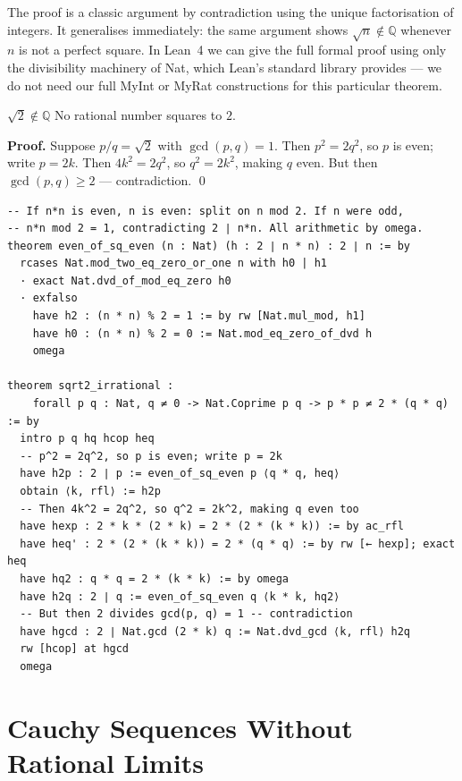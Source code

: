 \documentclass[12pt, openany]{book}
\theoremstyle{plain}
\theoremstyle{definition}
\theoremstyle{remark}
\newcommand{\Q}{\mathbb{Q}}
\newcommand{\li}[1]{{\ttfamily\small\color{tealaccent}#1}}
\begin{document}
The proof is a classic argument by contradiction using the unique factorisation of integers.  It generalises immediately: the same argument shows $\sqrt{n} \notin \Q$ whenever $n$ is not a perfect square.  In Lean~4 we can give the full formal proof using only the divisibility machinery of \li{Nat}, which Lean's standard library provides --- we do not need our full \li{MyInt} or \li{MyRat} constructions for this particular theorem.

\begin{thmbox}{$\sqrt{2} \notin \Q$}
No rational number squares to $2$.

\textbf{Proof.} Suppose $p/q = \sqrt{2}$ with $\gcd(p,q)=1$. Then $p^2 = 2q^2$, so $p$ is even; write $p = 2k$. Then $4k^2 = 2q^2$, so $q^2 = 2k^2$, making $q$ even. But then $\gcd(p,q) \geq 2$ --- contradiction. \qed
\end{thmbox}

\begin{leanbox}
\begin{lstlisting}
-- If n*n is even, n is even: split on n mod 2. If n were odd,
-- n*n mod 2 = 1, contradicting 2 ∣ n*n. All arithmetic by omega.
theorem even_of_sq_even (n : Nat) (h : 2 ∣ n * n) : 2 ∣ n := by
  rcases Nat.mod_two_eq_zero_or_one n with h0 | h1
  · exact Nat.dvd_of_mod_eq_zero h0
  · exfalso
    have h2 : (n * n) % 2 = 1 := by rw [Nat.mul_mod, h1]
    have h0 : (n * n) % 2 = 0 := Nat.mod_eq_zero_of_dvd h
    omega

theorem sqrt2_irrational :
    forall p q : Nat, q ≠ 0 -> Nat.Coprime p q -> p * p ≠ 2 * (q * q) := by
  intro p q hq hcop heq
  -- p^2 = 2q^2, so p is even; write p = 2k
  have h2p : 2 ∣ p := even_of_sq_even p ⟨q * q, heq⟩
  obtain ⟨k, rfl⟩ := h2p
  -- Then 4k^2 = 2q^2, so q^2 = 2k^2, making q even too
  have hexp : 2 * k * (2 * k) = 2 * (2 * (k * k)) := by ac_rfl
  have heq' : 2 * (2 * (k * k)) = 2 * (q * q) := by rw [← hexp]; exact heq
  have hq2 : q * q = 2 * (k * k) := by omega
  have h2q : 2 ∣ q := even_of_sq_even q ⟨k * k, hq2⟩
  -- But then 2 divides gcd(p, q) = 1 -- contradiction
  have hgcd : 2 ∣ Nat.gcd (2 * k) q := Nat.dvd_gcd ⟨k, rfl⟩ h2q
  rw [hcop] at hgcd
  omega
\end{lstlisting}
\end{leanbox}
\color{black}

\section{Cauchy Sequences Without Rational Limits}
\end{document}
